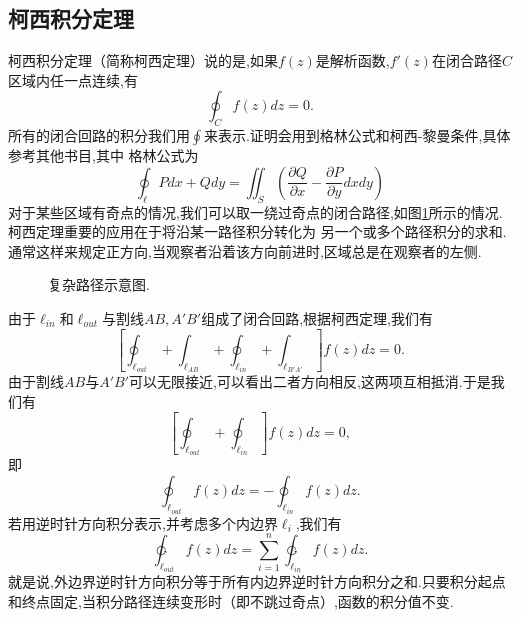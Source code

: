\subsection{柯西积分定理}
\label{subsec:cauchy_theorem}
柯西积分定理（简称柯西定理）说的是,如果$f(z)$是解析函数,$f'(z)$在闭合路径$C$%
区域内任一点连续,有
\begin{equation}
    \oint_C f(z) dz = 0.
\end{equation}
所有的闭合回路的积分我们用$\oint$来表示.证明会用到格林公式和柯西-黎曼条件,具体参考其他书目,其中
格林公式为
\begin{equation}
    \oint_\ell P dx + Q dy = \iint_S \left( \frac{\partial Q}{\partial x} - \frac{\partial P}{\partial y} dx dy \right)
\end{equation}
对于某些区域有奇点的情况,我们可以取一绕过奇点的闭合路径,如图\ref{fig:complexregion}所示的情况.柯西定理重要的应用在于将沿某一路径积分转化为
另一个或多个路径积分的求和.通常这样来规定正方向,当观察者沿着该方向前进时,区域总是在观察者的左侧.
\begin{figure}
    \centering
    
    \caption{复杂路径示意图.}
    \label{fig:complexregion}
\end{figure}
由于$\ell_{in}$和$\ell_{out}$与割线$AB,A'B'$组成了闭合回路,根据柯西定理,我们有
\[
    \left[ \oint _{\ell_{out}} + \int _{\ell_{AB}} + \oint _{\ell_{in}} + \int _{\ell_{B'A'}} \right] f(z) dz = 0 .
\]   
由于割线$AB$与$A'B'$可以无限接近,可以看出二者方向相反,这两项互相抵消.于是我们有
\[
    \left[ \oint _{\ell_{out}} + \oint _{\ell_{in}}  \right] f(z) dz = 0,
\]
即
\[
    \oint_{\ell_{out}} f(z) dz = - \oint _{\ell_{in}}f(z) dz .
\]
若用逆时针方向积分表示,并考虑多个内边界$\ell_{i}$,我们有
\begin{equation}
    \ointctrclockwise_{\ell_{out}} f(z) dz = \sum_{i=1}^{n} \ointctrclockwise_{\ell_{in}} f(z) dz .
\end{equation}
就是说,外边界逆时针方向积分等于所有内边界逆时针方向积分之和.只要积分起点和终点固定,当积分路径连续变形时（即不跳过奇点）,函数的积分值不变.

